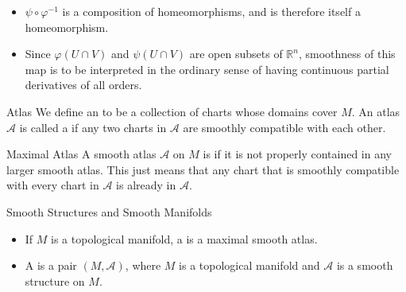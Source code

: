 \documentclass[../main.tex]{subfiles}
\begin{document}
\begin{remark}
    \begin{itemize}
        \item \(  \psi \circ  \varphi ^{-1}   \)  is a composition of homeomorphisms, and is therefore itself a homeomorphism.
        \item Since $\varphi(U \cap V)$ and $\psi(U \cap V)$ are open subsets of $\mathbb{R}^n$, smoothness of this map is to be interpreted in the ordinary sense of having continuous partial derivatives of all orders. 
    \end{itemize}
    
\end{remark}

\begin{definition}{Atlas}{}
    We define an  to be a collection of charts whose domains cover $M$.
An atlas $\mathcal{A}$ is called a  if any two charts in $\mathcal{A}$ are smoothly compatible with each other.
\end{definition}

\begin{definition}{Maximal Atlas}{}
   A smooth atlas $\mathcal{A}$ on $M$ is  if it is not properly contained in any larger smooth atlas. This just means that any chart that is smoothly compatible with every chart in $\mathcal{A}$ is already in $\mathcal{A}$. 
\end{definition}

\begin{definition}{Smooth Structures and Smooth Manifolds}{}
\begin{itemize}
    \item   If $M$ is a topological manifold, a  is a maximal smooth atlas.
    \item  A  is a pair $(M, \mathcal{A})$, where $M$ is a topological manifold and $\mathcal{A}$ is a smooth structure on $M$.
\end{itemize}
\end{definition}
\end{document}
